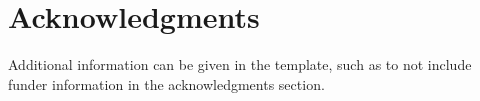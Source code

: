 \documentclass[fleqn,10pt]{olplainarticle}
\begin{document}
\section*{Acknowledgments}

Additional information can be given in the template, such as to not include funder information in the acknowledgments section.


\end{document}
